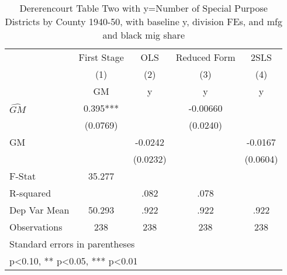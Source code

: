 \begin{table}[htbp]\centering
\def\sym#1{\ifmmode^{#1}\else\(^{#1}\)\fi}
\caption{Dererencourt Table Two with y=Number of Special Purpose Districts by County 1940-50, with baseline y, division FEs, and mfg and black mig share}
\begin{tabular}{l*{4}{c}}
\toprule
                    & First Stage   &         OLS   &Reduced Form   &        2SLS   \\
                    &\multicolumn{1}{c}{(1)}&\multicolumn{1}{c}{(2)}&\multicolumn{1}{c}{(3)}&\multicolumn{1}{c}{(4)}\\
                    &\multicolumn{1}{c}{GM}&\multicolumn{1}{c}{y}&\multicolumn{1}{c}{y}&\multicolumn{1}{c}{y}\\
\midrule
$\hat{GM}$          &       0.395***&               &    -0.00660   &               \\
                    &    (0.0769)   &               &    (0.0240)   &               \\
\addlinespace
GM                  &               &     -0.0242   &               &     -0.0167   \\
                    &               &    (0.0232)   &               &    (0.0604)   \\
\midrule
F-Stat              &      35.277   &               &               &               \\
R-squared           &               &        .082   &        .078   &               \\
Dep Var Mean        &      50.293   &        .922   &        .922   &        .922   \\
Observations        &         238   &         238   &         238   &         238   \\
\bottomrule
\multicolumn{5}{l}{\footnotesize Standard errors in parentheses}\\
\multicolumn{5}{l}{\footnotesize * p<0.10, ** p<0.05, *** p<0.01}\\
\end{tabular}
\end{table}
